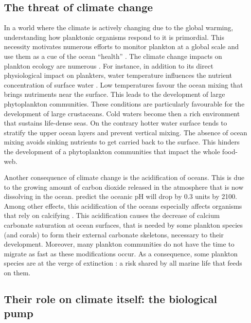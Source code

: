 \subsection{The threat of climate change}

In a world where the climate is actively changing due to the global warming, understanding how planktonic organisms respond to it is primordial.
This necessity motivates numerous efforts to monitor plankton at a global scale \citep{brander2003use, batten2019global} and use them as a cue of the ocean ``health'' \citep{suthers2019importance}.
The climate change impacts on plankton ecology are numerous \citep{mckinnon2007vulnerability, hays2005climate}.
For instance, in addition to its direct physiological impact on plankters, water temperature influences the nutrient concentration of surface water \citep{bouman2003temperature, richardson2008hot, doney2006plankton}.
Low temperatures favour the ocean mixing that brings nutriments near the surface.
This leads to the development of large phytoplankton communities.
These conditions are particularly favourable for the development of large crustaceans.
Cold waters become then a rich environment that sustains life-dense seas.
On the contrary hotter water surface tends to stratify the upper ocean layers and prevent vertical mixing.
The absence of ocean mixing avoids sinking nutrients to get carried back to the surface.
This hinders the development of a phytoplankton communities that impact the whole food-web.

Another consequence of climate change is the acidification of oceans. 
This is due to the growing amount of carbon dioxide released in the atmosphere that is now dissolving in the ocean.
\citet{caldeira2003anthropogenic} predict the oceanic pH will drop by 0.3 units by 2100.
Among other effects, this acidification of the oceans especially affects organisms that rely on calcifying \citep{orr2005anthropogenic, flynn2012changes}.
This acidification causes the decrease of calcium carbonate saturation at ocean surfaces, that is needed by some plankton species (and corals) to form their external carbonate skeletons, necessary to their development.
Moreover, many plankton communities do not have the time to migrate as fast as these modifications occur.
As a consequence, some plankton species are at the verge of extinction \citep{trubovitz2020marine, lowery2020ecological}: a risk shared by all marine life that feeds on them.

\subsection{Their role on climate itself: the biological pump}

